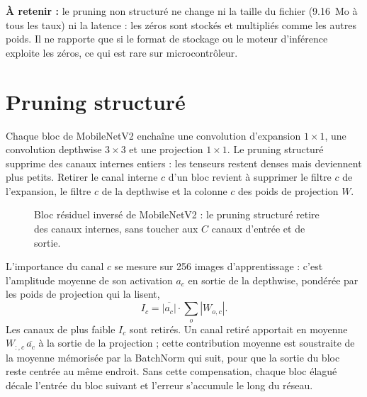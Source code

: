 


\begin{imp}
\textbf{À retenir :} le pruning non structuré ne change ni la taille du fichier (9.16~Mo à tous les taux) ni la latence : les zéros sont stockés et multipliés comme les autres poids. Il ne rapporte que si le format de stockage ou le moteur d'inférence exploite les zéros, ce qui est rare sur microcontrôleur.
\end{imp}

\section{Pruning structuré}

Chaque bloc de MobileNetV2 enchaîne une convolution d'expansion $1 \times 1$, une convolution depthwise $3 \times 3$ et une projection $1 \times 1$. Le pruning structuré supprime des canaux internes entiers : les tenseurs restent denses mais deviennent plus petits. Retirer le canal interne $c$ d'un bloc revient à supprimer le filtre $c$ de l'expansion, le filtre $c$ de la depthwise et la colonne $c$ des poids de projection $W$. \\

\begin{figure}[H]
\centering
\resizebox{0.9\linewidth}{!}{}
\caption{Bloc résiduel inversé de MobileNetV2 : le pruning structuré retire des canaux internes, sans toucher aux $C$ canaux d'entrée et de sortie.}
\label{fig:tp6-block}
\end{figure}

L'importance du canal $c$ se mesure sur 256 images d'apprentissage : c'est l'amplitude moyenne de son activation $a_c$ en sortie de la depthwise, pondérée par les poids de projection qui la lisent,
\[
I_c = \overline{|a_c|} \cdot \sum_{o} |W_{o,c}|.
\]
Les canaux de plus faible $I_c$ sont retirés. Un canal retiré apportait en moyenne $W_{:,c}\,\overline{a_c}$ à la sortie de la projection ; cette contribution moyenne est soustraite de la moyenne mémorisée par la BatchNorm qui suit, pour que la sortie du bloc reste centrée au même endroit. Sans cette compensation, chaque bloc élagué décale l'entrée du bloc suivant et l'erreur s'accumule le long du réseau. \\

